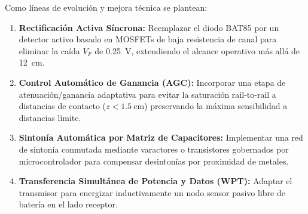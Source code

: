 Como líneas de evolución y mejora técnica se plantean:
\begin{enumerate}
    \item \textbf{Rectificación Activa Síncrona:} Reemplazar el diodo BAT85 por un detector activo basado en MOSFETs de baja resistencia de canal para eliminar la caída $V_F$ de \SI{0.25}{\volt}, extendiendo el alcance operativo más allá de \SI{12}{\centi\meter}.
    \item \textbf{Control Automático de Ganancia (AGC):} Incorporar una etapa de atenuación/ganancia adaptativa para evitar la saturación rail-to-rail a distancias de contacto ($z < \SI{1.5}{\centi\meter}$) preservando la máxima sensibilidad a distancias límite.
    \item \textbf{Sintonía Automática por Matriz de Capacitores:} Implementar una red de sintonía conmutada mediante varactores o transistores gobernados por microcontrolador para compensar desintonías por proximidad de metales.
    \item \textbf{Transferencia Simultánea de Potencia y Datos (WPT):} Adaptar el transmisor para energizar inductivamente un nodo sensor pasivo libre de batería en el lado receptor.
\end{enumerate}
